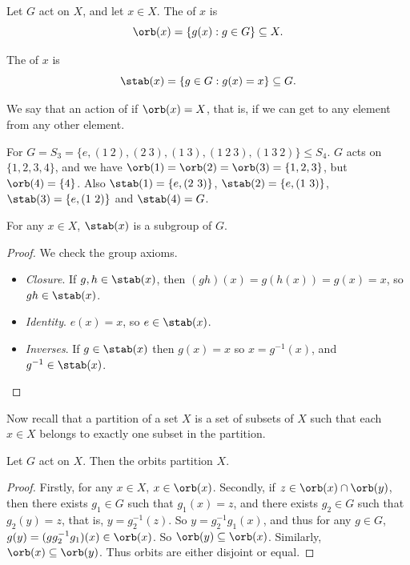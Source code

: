 \documentclass[a4paper]{scrartcl}
\begin{document}
\begin{definition}[Orbit]
Let $G$ act on $X$, and let $x \in X$. The  of $x$ is
$$
	\orb(x) = \{ g(x) : g \in G \} \subseteq X.
$$
\end{definition}

\begin{definition}[Stabilizer]
The  of $x$ is
$$
\stab(x) = \{ g \in G : g(x) = x \} \subseteq G.
$$
\end{definition}

We say that an action of  if $\orb(x) = X$, that is, if we can get to any element from any other element.

\begin{example}
	For $G = S_3 = \{e, (1\ 2), (2\ 3), (1\ 3), (1\ 2\ 3), (1\ 3\ 2)\} \leq S_4$. $G$ acts on $\{1, 2, 3, 4\}$, and we have $\orb(1) = \orb(2) = \orb(3) =\{1, 2, 3\}$, but $\orb(4) = \{4\}$. Also $\stab(1) = \{e, (2\ 3)\}$, $\stab(2) = \{ e, (1\ 3)\}$, $\stab(3) = \{ e, (1\ 2)\}$ and $\stab(4) = G$.
\end{example}

\begin{lemma}
	For any $x \in X$, $\stab(x)$ is a subgroup of $G$.
\end{lemma}
\begin{proof}
	We check the group axioms.
	\begin{itemize}
		\item \emph{Closure}. If $g, h \in \stab(x)$, then $(gh)(x) = g(h(x)) = g(x) = x$, so $gh \in \stab(x)$.
		\item \emph{Identity}. $e(x) = x$, so $e \in \stab(x)$.
		\item \emph{Inverses}. If $g \in \stab(x)$ then $g(x) = x$ so $x = g^{-1}(x)$, and $g^{-1} \in \stab(x)$.
	\end{itemize}
\end{proof}

Now recall that a partition of a set $X$ is a set of subsets of $X$ such that each $x \in X$ belongs to exactly one subset in the partition.

\begin{lemma}
	Let $G$ act on $X$. Then the orbits partition $X$.
\end{lemma}
\begin{proof}
	Firstly, for any $x \in X$, $x \in \orb(x)$. Secondly, if $z \in \orb(x) \cap \orb(y)$, then there exists $g_1 \in G$ such that $g_1(x) = z$, and there exists $g_2 \in G$ such that $g_2 (y) = z$, that is, $y = g_2^{-1}(z)$. So $y = g_2^{-1} g_1 (x)$, and thus for any $g \in G$, $g(y) = (g g_2^{-1} g_1)(x) \in \orb(x)$. So $\orb(y) \subseteq \orb(x)$. Similarly, $\orb(x) \subseteq \orb(y)$. Thus orbits are either disjoint or equal.
\end{proof}
\end{document}
